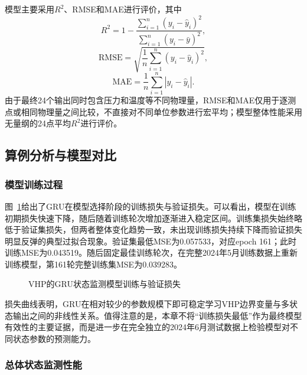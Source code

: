 模型主要采用$R^2$、RMSE和MAE进行评价，其中
\begin{equation}
R^2=
1-
\frac{\sum_{i=1}^{n}(y_i-\hat{y}_i)^2}
{\sum_{i=1}^{n}(y_i-\bar{y})^2},
\end{equation}
\begin{equation}
\mathrm{RMSE}=
\sqrt{
\frac{1}{n}
\sum_{i=1}^{n}
(y_i-\hat{y}_i)^2
},
\end{equation}
\begin{equation}
\mathrm{MAE}=
\frac{1}{n}
\sum_{i=1}^{n}
|y_i-\hat{y}_i|.
\end{equation}
由于最终24个输出同时包含压力和温度等不同物理量，RMSE和MAE仅用于逐测点或相同物理量之间比较，不直接对不同单位参数进行宏平均；模型整体性能采用无量纲的24点平均$R^2$进行评价。

\subsection{算例分析与模型对比}
\label{subsec:health_results}

\subsubsection{模型训练过程}

图~\ref{fig:gru_loss}给出了GRU在模型选择阶段的训练损失与验证损失。可以看出，模型在训练初期损失快速下降，随后随着训练轮次增加逐渐进入稳定区间。训练集损失始终略低于验证集损失，但两者整体变化趋势一致，未出现训练损失持续下降而验证损失明显反弹的典型过拟合现象。验证集最低MSE为0.057533，对应epoch 161；此时训练MSE为0.043519。随后固定最佳训练轮次，在完整2024年5月训练数据上重新训练模型，第161轮完整训练集MSE为0.039283。

\begin{figure}[htbp]
    \centering
    \caption{VHP的GRU状态监测模型训练与验证损失}
    \label{fig:gru_loss}
\end{figure}

损失曲线表明，GRU在相对较少的参数规模下即可稳定学习VHP边界变量与多状态输出之间的非线性关系。值得注意的是，本章不将“训练损失最低”作为最终模型有效性的主要证据，而是进一步在完全独立的2024年6月测试数据上检验模型对不同状态参数的预测能力。

\subsubsection{总体状态监测性能}

